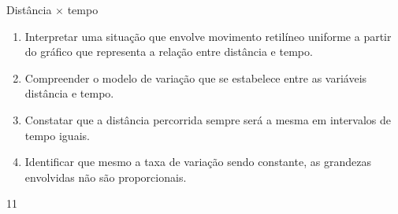 \clearpage
\def\currentcolor{session1}
\begin{objectives}{Distância $\times$ tempo}
{
\begin{enumerate}

\item Interpretar uma situação que envolve movimento retilíneo uniforme a partir do gráfico que representa a relação entre distância e tempo.
\item Compreender o modelo de variação que se estabelece entre as variáveis distância e tempo.
\item Constatar que a distância percorrida sempre será a mesma em intervalos de tempo iguais.
\item Identificar que mesmo a taxa de variação sendo constante, as grandezas envolvidas não são proporcionais.
\end{enumerate}
}{1}{1}
\end{objectives}
